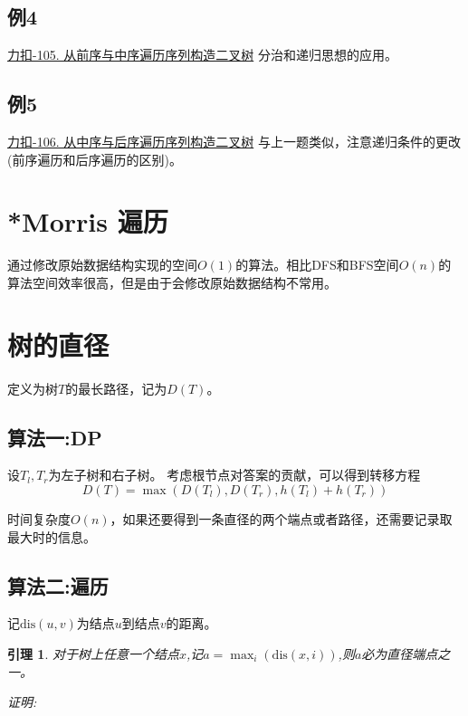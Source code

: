 \documentclass{article}
\newtheorem{lemma}{引理}
\newcommand{\dis}{\text{dis}}
\begin{document}
\subsection{例4}
\href{https://leetcode.cn/problems/construct-binary-tree-from-preorder-and-inorder-traversal/}{力扣-105. 从前序与中序遍历序列构造二叉树}
分治和递归思想的应用。


\subsection{例5}
\href{https://leetcode.cn/problems/construct-binary-tree-from-inorder-and-postorder-traversal/}{力扣-106. 从中序与后序遍历序列构造二叉树}
与上一题类似，注意递归条件的更改(前序遍历和后序遍历的区别)。


\section{*Morris 遍历}
通过修改原始数据结构实现的空间$O(1)$的算法。相比DFS和BFS空间$O(n)$的算法空间效率很高，但是由于会修改原始数据结构不常用。

\section{树的直径}
定义为树$T$的最长路径，记为$D(T)$。

\subsection{算法一:DP}
设$T_l,T_r$为左子树和右子树。
考虑根节点对答案的贡献，可以得到转移方程
\begin{equation}
    D(T) = \max(D(T_l),D(T_r),h(T_l)+h(T_r))
\end{equation}

时间复杂度$O(n)$，如果还要得到一条直径的两个端点或者路径，还需要记录取最大时的信息。

\subsection{算法二:遍历}
记$\text{dis}(u,v)$为结点$u$到结点$v$的距离。

\begin{lemma}
    对于树上任意一个结点$x$,记$a = \max_{i}(\dis(x,i))$,则$a$必为直径端点之一。
    \label{lemma-1}
\end{lemma}

\emph{证明:}
\end{document}
